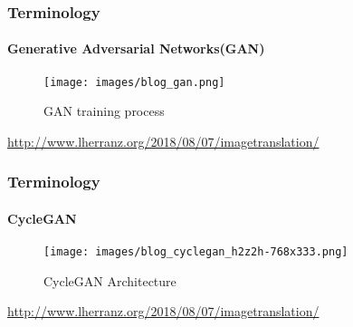 \documentclass[aspectratio=169, lecture, amberg]{OTHAWbeamer}
\begin{document}
\begin{frame}
\frametitle{Terminology}
\framesubtitle{Generative Adversarial Networks(GAN)}
\begin{figure}
    \centering
    \texttt{[image: images/blog\_gan.png]}
    \caption{GAN training process}
\end{figure}
\tiny{\footnotemark \url{http://www.lherranz.org/2018/08/07/imagetranslation/}}
\end{frame}
\note{}

\begin{comment}
\begin{frame}
    \frametitle{Terminology}
    \framesubtitle{Generative Adversarial Networks(GAN)}
    \begin{block}{Generator loss}
        \begin{equation}
            \min_G \mathcal{L}_G = \mathbb{E}_{z \sim p_z(z)} [\log(1 - D(G(z)))]
        \end{equation}
    \end{block}
    \begin{block}{Discriminator loss}
        \begin{equation}
            \max_D \mathcal{L}_D = \mathbb{E}_{x \sim p_{\text{data}}(x)} [\log D(x)] + \mathbb{E}_{z \sim p_z(z)} [\log(1 - D(G(z)))]
        \end{equation}
    \end{block}
    \tiny\footnotemark \url{Goodfellow, I., Pouget-Abadie, J., Mirza, M., Xu, B., Warde-Farley, D., Ozair,
    S., Courville, A., Bengio, Y.: Generative adversarial nets. In: Neural Information
    Processing Systems (NeurIPS) (2014)}
\end{frame}
\end{comment}
\begin{frame}
\frametitle{Terminology}
\framesubtitle{CycleGAN}
\begin{figure}
    \centering
    \texttt{[image: images/blog\_cyclegan\_h2z2h-768x333.png]}
    \caption{CycleGAN Architecture}
\end{figure}
\tiny{\footnotemark \url{http://www.lherranz.org/2018/08/07/imagetranslation/}}
\end{frame}
\end{document}
